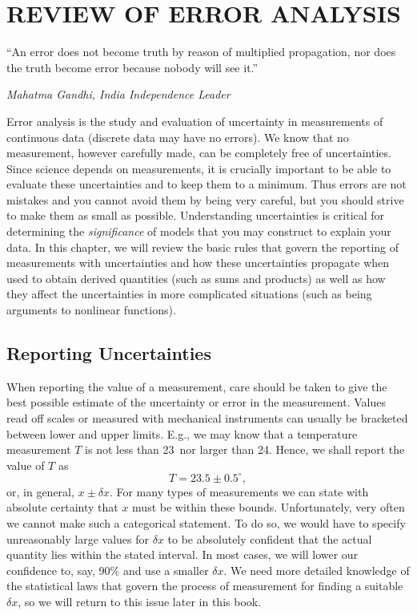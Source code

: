 %
\chapter{REVIEW OF ERROR ANALYSIS}
\label{ch:error}
\epigraph{``An error does not become truth by reason of multiplied propagation, nor does the truth become error because nobody will see it.''}{\textit{Mahatma Gandhi, India Independence Leader}}

	Error analysis is the study and evaluation of uncertainty in measurements of continuous data 
(discrete data may have no errors).  We know that no measurement, however carefully made, 
can be completely free of uncertainties.  Since science depends on measurements, it is 
crucially important to be able to evaluate these uncertainties and to keep them to a minimum.  
Thus errors are not mistakes and you cannot avoid them by being very careful, but you should strive to make them 
as small as possible.  Understanding uncertainties is critical for determining the \emph{significance} of models
that you may construct to explain your data.  In this chapter, we will review the basic rules that govern
the reporting of measurements with uncertainties and how these uncertainties propagate when used to
obtain derived quantities (such as sums and products) as well as how they affect the uncertainties in
more complicated situations (such as being arguments to nonlinear functions).

\section{Reporting Uncertainties}

	When reporting the value of a measurement, care should be taken to give the best possible 
estimate of the uncertainty or error in the measurement.  Values read off scales or measured with 
mechanical instruments can usually be bracketed between lower and upper limits.  E.g., we may know
that a temperature measurement $T$ is not less than 23\DS\ nor larger than 24\DS.  Hence, we
shall report the value of $T$ as
\begin{equation}
T = 23.5 \pm 0.5^{\circ},
\end{equation}
or, in general, $x \pm \delta x$.  For many types of measurements we can state with absolute certainty that 
$x$ must be within these bounds.  Unfortunately, very often we cannot make such a categorical 
statement.  To do so, we would have to specify unreasonably large values for $\delta x$ to be absolutely confident that 
the actual quantity lies within the stated interval.  In most cases, we will lower our confidence to, 
say, 90\% and use a smaller $\delta x$.  We need more detailed knowledge of the statistical laws that 
govern the process of measurement for finding a suitable $\delta x$, so we will return to this issue later in this book.


